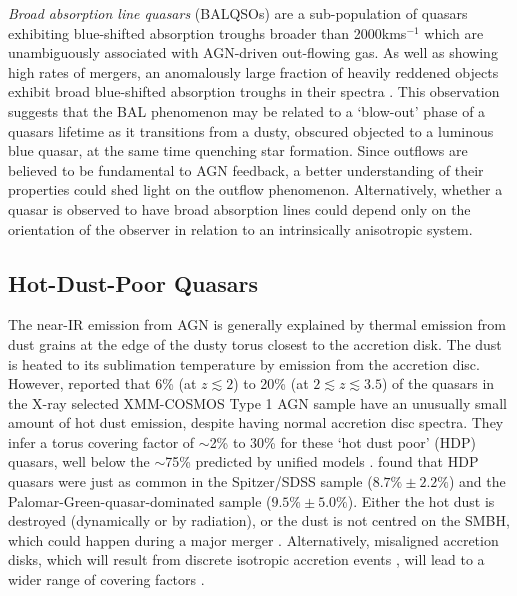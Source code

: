 {\it Broad absorption line quasars} (BALQSOs) are a sub-population of quasars exhibiting blue-shifted absorption troughs broader than 2000kms$^{-1}$ \citep{weymann91} which are unambiguously associated with AGN-driven out-flowing gas. As well as showing high rates of mergers, an anomalously large fraction of heavily reddened objects exhibit broad blue-shifted absorption troughs in their spectra \citep{urrutia09, glikman12}. This observation suggests that the BAL phenomenon may be related to a `blow-out' phase of a quasars lifetime as it transitions from a dusty, obscured objected to a luminous blue quasar, at the same time quenching star formation. Since outflows are believed to be fundamental to AGN feedback, a better understanding of their properties could shed light on the outflow phenomenon. Alternatively, whether a quasar is observed to have broad absorption lines could depend only on the orientation of the observer in relation to an intrinsically anisotropic system.

\subsection{Hot-Dust-Poor Quasars}

The near-IR emission from AGN is generally explained by thermal emission from dust grains at the edge of the dusty torus closest to the accretion disk. The dust is heated to its sublimation temperature \citep[1300-2000K][]{barvainis92} by emission from the accretion disc. However, \citet{hao10} reported that 6\% (at $z \lesssim 2$) to 20\% (at $2 \lesssim z \lesssim 3.5$) of the quasars in the X-ray selected XMM-COSMOS Type 1 AGN sample \citep{brusa10} have an unusually small amount of hot dust emission, despite having normal accretion disc spectra. They infer a torus covering factor of  $\sim$2\% to 30\% for these `hot dust poor' (HDP) quasars, well below the $\sim$75\% predicted by unified models \citep[e.g.][]{krolik88}. \citet{hao11} found that HDP quasars were just as common in the \citet{richards06} Spitzer/SDSS sample ($8.7\% \pm 2.2\%$) and the \citet{elvis94} Palomar-Green-quasar-dominated sample ($9.5\% \pm 5.0\%$). Either the hot dust is destroyed (dynamically or by radiation), or the dust is not centred on the SMBH, which could happen during a major merger \citep[e.g.][]{blecha11}. Alternatively, misaligned accretion disks, which will result from discrete isotropic accretion events \citep{volonteri07}, will lead to a wider range of covering factors \citep{lawrence10}. 

